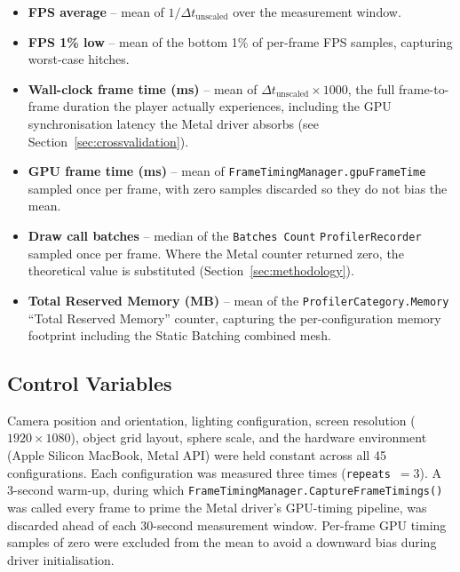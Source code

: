 \documentclass[11pt,a4paper]{article}
\begin{document}
\begin{itemize}
  \item \textbf{FPS average} -- mean of $1/\Delta t_{\text{unscaled}}$ over the
        measurement window.
  \item \textbf{FPS 1\% low} -- mean of the bottom 1\% of per-frame FPS samples,
        capturing worst-case hitches.
  \item \textbf{Wall-clock frame time (ms)} -- mean of
        $\Delta t_{\text{unscaled}} \times 1000$, the full frame-to-frame duration the
        player actually experiences, including the GPU synchronisation latency the
        Metal driver absorbs (see Section~\ref{sec:crossvalidation}).
  \item \textbf{GPU frame time (ms)} -- mean of \texttt{FrameTimingManager.gpuFrameTime}
        sampled once per frame, with zero samples discarded so they do not bias the
        mean.
  \item \textbf{Draw call batches} -- median of the \texttt{Batches Count}
        \texttt{ProfilerRecorder} sampled once per frame. Where the Metal counter
        returned zero, the theoretical value is substituted
        (Section~\ref{sec:methodology}).
  \item \textbf{Total Reserved Memory (MB)} -- mean of the
        \texttt{ProfilerCategory.Memory} ``Total Reserved Memory'' counter, capturing
        the per-configuration memory footprint including the Static Batching combined
        mesh.
\end{itemize}

\subsection{Control Variables}

Camera position and orientation, lighting configuration, screen resolution
($1920\times1080$), object grid layout, sphere scale, and the hardware environment
(Apple Silicon MacBook, Metal API) were held constant across all 45 configurations.
Each configuration was measured three times (\texttt{repeats}~$= 3$). A 3-second
warm-up, during which \texttt{FrameTimingManager.CaptureFrameTimings()} was called
every frame to prime the Metal driver's GPU-timing pipeline, was discarded ahead of
each 30-second measurement window. Per-frame GPU timing samples of zero were excluded
from the mean to avoid a downward bias during driver initialisation.

\end{document}
